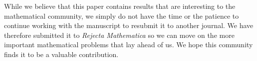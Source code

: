 \documentclass[11pt]{article}
\begin{document}
While we believe that this paper contains results that are interesting
to the mathematical community, we simply do not have the time or the
patience to continue working with the manuscript to resubmit it to
another journal.  We have therefore submitted it to \emph{Rejecta
  Mathematica} so we can move on the more important mathematical
problems that lay ahead of us.  We hope this community finds it to be
a valuable contribution.
\end{document}
